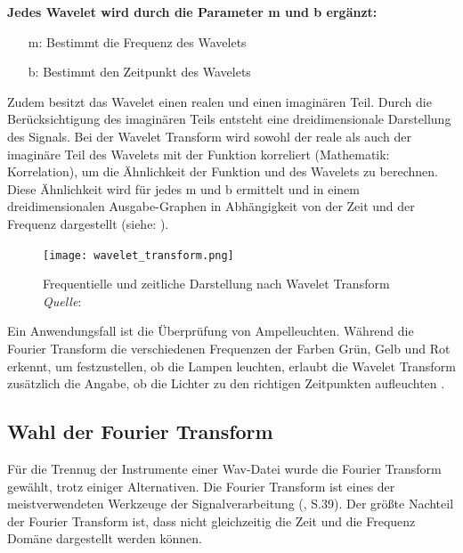 \textbf{Jedes Wavelet wird durch die Parameter m und b ergänzt:}

%
\begin{itemize}
    \item[m:] Bestimmt die Frequenz des Wavelets
    \item[b:] Bestimmt den Zeitpunkt des Wavelets
\end{itemize}
%

Zudem besitzt das Wavelet einen realen und einen imaginären Teil. Durch die Berücksichtigung des imaginären Teils entsteht eine dreidimensionale Darstellung des Signals. Bei der Wavelet Transform wird sowohl der reale als auch der imaginäre Teil des Wavelets mit der Funktion korreliert (Mathematik: Korrelation), um die Ähnlichkeit der Funktion und des Wavelets zu berechnen. Diese Ähnlichkeit wird für jedes m und b ermittelt und in einem dreidimensionalen Ausgabe-Graphen in Abhängigkeit von der Zeit und der Frequenz dargestellt (siehe: \cite{wavelet_transform}).

%
\begin{figure}[h]
    \texttt{[image: wavelet\_transform.png]}
    \caption{Frequentielle und zeitliche Darstellung nach Wavelet Transform\\\hspace{\textwidth}\textit{Quelle}: \cite{wavelet_transform}}
    \label{fig:wavelet_transform}
\end{figure}
%

Ein Anwendungsfall ist die Überprüfung von Ampelleuchten. Während die Fourier Transform die verschiedenen Frequenzen der Farben Grün, Gelb und Rot erkennt, um festzustellen, ob die Lampen leuchten, erlaubt die Wavelet Transform zusätzlich die Angabe, ob die Lichter zu den richtigen Zeitpunkten aufleuchten \parencite{wavelets}.

%
\subsection{Wahl der Fourier Transform}
%

Für die Trennug der Instrumente einer Wav-Datei wurde die Fourier Transform gewählt, trotz einiger Alternativen. Die Fourier Transform ist eines der meistverwendeten Werkzeuge der Signalverarbeitung (\cite{fundamentals_of_music_processing}, S.39). Der größte Nachteil der Fourier Transform ist, dass nicht gleichzeitig die Zeit und die Frequenz Domäne dargestellt werden können.

\par

